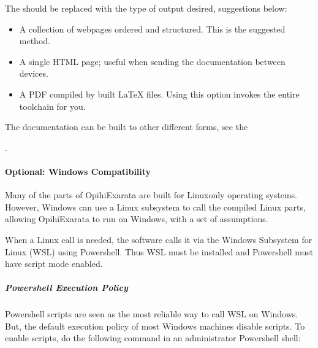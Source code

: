 \documentclass[letterpaper,11pt,english]{sphinxmanual}
\begin{document}
\sphinxAtStartPar
The  should be replaced with the type of output desired,
suggestions below:
\begin{itemize}
\item {} 
\sphinxAtStartPar
{} A collection of webpages ordered and structured. This is the suggested method.

\item {} 
\sphinxAtStartPar
{} A single HTML page; useful when sending the documentation between devices.

\item {} 
\sphinxAtStartPar
{} A PDF compiled by built LaTeX files. Using this option invokes the entire toolchain for you.

\end{itemize}

\sphinxAtStartPar
The documentation can be built to other different forms, see the
%
\begin{footnote}[29]\sphinxAtStartFootnote
{}
%
\end{footnote}.

\sphinxstepscope


\paragraph{Optional: Windows Compatibility}
\label{\detokenize{technical/installation/windows:optional-windows-compatibility}}\label{\detokenize{technical/installation/windows:technical-installation-windows-compatibility}}\label{\detokenize{technical/installation/windows::doc}}
\sphinxAtStartPar
Many of the parts of OpihiExarata are built for Linux\sphinxhyphen{}only operating systems.
However, Windows can use a Linux subsystem to call the compiled Linux parts,
allowing OpihiExarata to run on Windows, with a set of assumptions.

\sphinxAtStartPar
When a Linux call is needed, the software calls it via the Windows Subsystem
for Linux (WSL) using Powershell. Thus WSL must be installed and Powershell
must have script mode enabled.


\subparagraph{Powershell Execution Policy}
\label{\detokenize{technical/installation/windows:powershell-execution-policy}}
\sphinxAtStartPar
Powershell scripts are seen as the most reliable way to call WSL on Windows.
But, the default execution policy of most Windows machines disable scripts. To
enable scripts, do the following command in an administrator Powershell shell:
\end{document}

